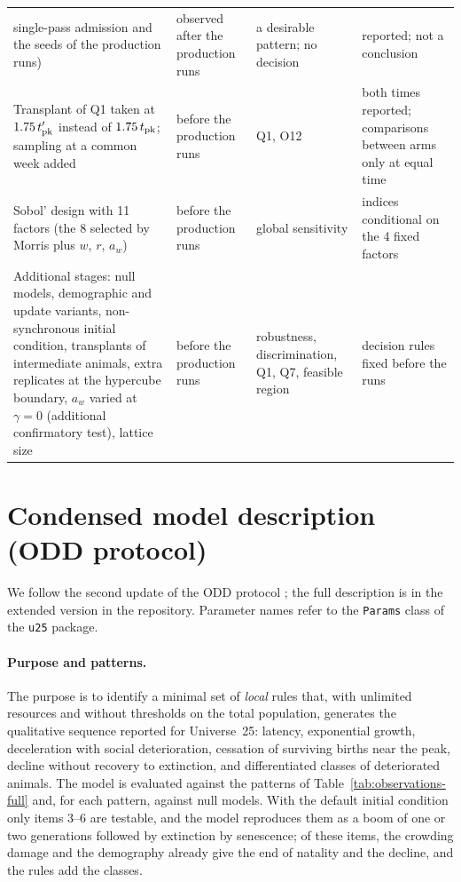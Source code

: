 \documentclass[pre,onecolumn,superscriptaddress,notitlepage]{revtex4-2}
\providecommand{\extended}{the extended version in the repository}
\begin{document}
\begin{table}[ht]
\begin{tabular}{@{}p{5.2cm}p{2.8cm}p{4.4cm}p{4.0cm}@{}}
single-pass admission and the seeds of the production runs) & observed after the production runs & a desirable pattern; no
decision & reported; not a conclusion \\
Transplant of Q1 taken at $1.75\,t'_{\rm pk}$ instead of $1.75\,t_{\rm pk}$; sampling at a common week added &
before the production runs & Q1, O12 & both times reported; comparisons between arms only at equal time \\
Sobol' design with 11 factors (the 8 selected by Morris plus $w$, $r$, $a_w$) & before the production runs & global
sensitivity & indices conditional on the 4 fixed factors \\
Additional stages: null models, demographic and update variants, non-synchronous initial condition, transplants of
intermediate animals, extra replicates at the hypercube boundary, $a_w$ varied at $\gamma=0$ (additional confirmatory test), lattice size & before the production runs & robustness, discrimination, Q1, Q7, feasible region & decision rules fixed before the runs \\
\bottomrule
\end{tabular}
\end{table}

\section{Condensed model description (ODD protocol)}
\label{supp:odd}

We follow the second update of the ODD protocol \cite{Grimm2020}; the full description is in \extended.
Parameter names refer to the \texttt{Params} class of the \texttt{u25} package.

\paragraph{Purpose and patterns.}
The purpose is to identify a minimal set of \emph{local} rules that, with unlimited resources and without
thresholds on the total population, generates the qualitative sequence reported for Universe~25: latency,
exponential growth, deceleration with social deterioration, cessation of surviving births near the peak, decline
without recovery to extinction, and differentiated classes of deteriorated animals. The model is evaluated against
the patterns of Table~\ref{tab:observations-full} and, for each pattern, against null models. With the default
initial condition only items 3--6 are testable, and the model reproduces them as a boom of one or two generations
followed by extinction by senescence; of these items, the crowding damage and the demography already give the end
of natality and the decline, and the rules add the classes.
\end{document}
